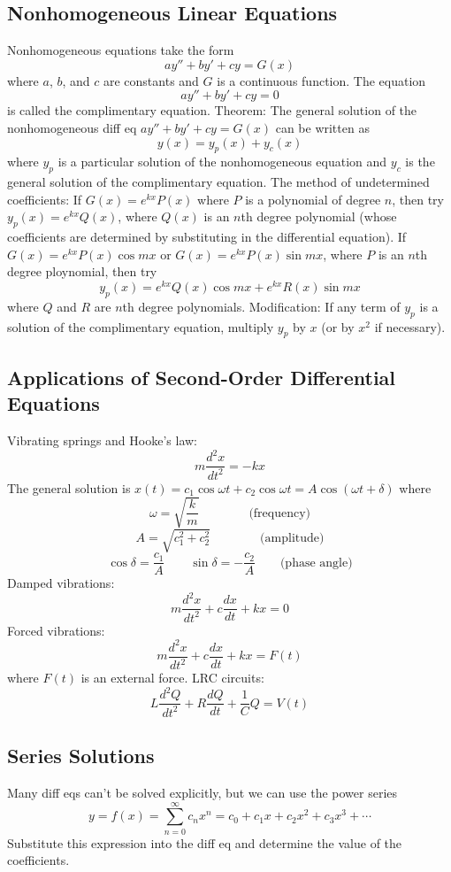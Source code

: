 \documentclass{article}
\begin{document}
\begin{multicols}{2}
    \subsection{Nonhomogeneous Linear Equations}
    \begin{outline}
        \1 Nonhomogeneous equations take the form \[ay''+by'+cy=G(x)\] where $a$, $b$, and $c$ are constants and $G$ is a continuous function. The equation \[ay''+by'+cy=0\] is called the complimentary equation. 
        \1 Theorem: The general solution of the nonhomogeneous diff eq \(ay''+by'+cy=G(x)\) can be written as \[y(x)=y_p(x)+y_c(x)\] where $y_p$ is a particular solution of the nonhomogeneous equation and $y_c$ is the general solution of the complimentary equation. 
        \1 The method of undetermined coefficients: 
            \2 If \(G(x)=e^{kx}P(x)\) where $P$ is a polynomial of degree $n$, then try \(y_p(x)=e^{kx}Q(x)\), where \(Q(x)\) is an $n$th degree polynomial (whose coefficients are determined by substituting in the differential equation). 
            \2 If \(G(x)=e^{kx}P(x)\cos mx\) or \(G(x)=e^{kx}P(x)\sin mx\), where $P$ is an $n$th degree ploynomial, then try \[y_p(x)=e^{kx}Q(x)\cos mx+e^{kx}R(x)\sin mx\] where $Q$ and $R$ are $n$th degree polynomials. 
            \2 Modification: If any term of $y_p$ is a solution of the complimentary equation, multiply $y_p$ by $x$ (or by $x^2$ if necessary). 

    \end{outline}
    \subsection{Applications of Second-Order Differential Equations}
    \begin{outline}
        \1 Vibrating springs and Hooke's law: \[m\dfrac{d^2x}{dt^2}=-kx\] The general solution is \(x(t)=c_1\cos\omega t+c_2\cos\omega t=A\cos(\omega t+\delta)\) where \[\omega=\sqrt{\dfrac{k}{m}}\qquad\qquad\text{(frequency)}\]\[A=\sqrt{c_1^2+c_2^2}\qquad\qquad\text{(amplitude)}\]\[\cos\delta=\dfrac{c_1}{A}\qquad\sin\delta=-\dfrac{c_2}{A}\qquad\text{(phase angle)}\]
        \1 Damped vibrations: \[m\dfrac{d^2x}{dt^2}+c\dfrac{dx}{dt}+kx=0\]
        \1 Forced vibrations: \[m\dfrac{d^2x}{dt^2}+c\dfrac{dx}{dt}+kx=F(t)\] where \(F(t)\) is an external force. 
        \1 LRC circuits: \[L\dfrac{d^2Q}{dt^2}+R\dfrac{dQ}{dt}+\dfrac{1}{C}Q=V(t)\]
    \end{outline}
    \subsection{Series Solutions}
    \begin{outline}
        \1 Many diff eqs can't be solved explicitly, but we can use the power series \[y=f(x)=\sum^\infty_{n=0}c_nx^n=c_0+c_1x+c_2x^2+c_3x^3+\cdots\]
        \1 Substitute this expression into the diff eq and determine the value of the coefficients. 
    \end{outline}\end{multicols}
\end{document}
